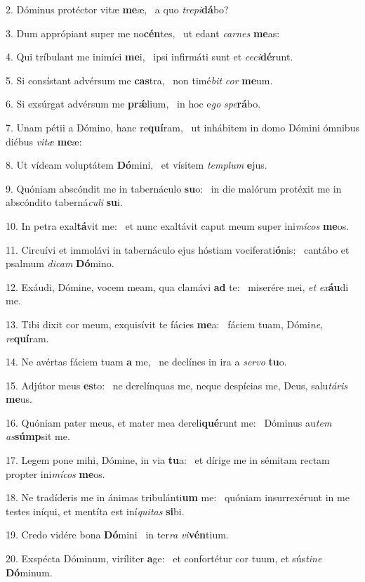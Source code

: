 2. Dóminus protéctor vitæ \textbf{me}æ, \ast\  a quo \textit{tre}\textit{pi}\textbf{dá}bo?\

3. Dum apprópiant super me no\textbf{cén}tes, \ast\  ut edant \textit{car}\textit{nes} \textbf{me}as:\

4. Qui tríbulant me inimíci \textbf{me}i, \ast\  ipsi infirmáti sunt et \textit{ce}\textit{ci}\textbf{dé}runt.\

5. Si consístant advérsum me \textbf{cas}tra, \ast\  non timé\textit{bit} \textit{cor} \textbf{me}um.\

6. Si exsúrgat advérsum me \textbf{prǽ}lium, \ast\  in hoc e\textit{go} \textit{spe}\textbf{rá}bo.\

7. Unam pétii a Dómino, hanc re\textbf{quí}ram, \ast\  ut inhábitem in domo Dómini ómnibus diébus \textit{vi}\textit{tæ} \textbf{me}æ:\

8. Ut vídeam voluptátem \textbf{Dó}mini, \ast\  et vísitem \textit{tem}\textit{plum} \textbf{e}jus.\

9. Quóniam abscóndit me in tabernáculo \textbf{su}o: \ast\  in die malórum protéxit me in abscóndito taberná\textit{cu}\textit{li} \textbf{su}i.\

10. In petra exal\textbf{tá}vit me: \ast\  et nunc exaltávit caput meum super ini\textit{mí}\textit{cos} \textbf{me}os.\

11. Circuívi et immolávi in tabernáculo ejus hóstiam vociferati\textbf{ó}nis: \ast\  cantábo et psalmum \textit{di}\textit{cam} \textbf{Dó}mino.\

12. Exáudi, Dómine, vocem meam, qua clamávi \textbf{ad} te: \ast\  miserére mei, \textit{et} \textit{ex}\textbf{áu}di me.\

13. Tibi dixit cor meum, exquisívit te fácies \textbf{me}a: \ast\  fáciem tuam, Dómi\textit{ne}, \textit{re}\textbf{quí}ram.\

14. Ne avértas fáciem tuam \textbf{a} me, \ast\  ne declínes in ira a \textit{ser}\textit{vo} \textbf{tu}o.\

15. Adjútor meus \textbf{es}to: \ast\  ne derelínquas me, neque despícias me, Deus, salu\textit{tá}\textit{ris} \textbf{me}us.\

16. Quóniam pater meus, et mater mea dereli\textbf{qué}runt me: \ast\  Dóminus au\textit{tem} \textit{as}\textbf{súmp}sit me.\

17. Legem pone mihi, Dómine, in via \textbf{tu}a: \ast\  et dírige me in sémitam rectam propter ini\textit{mí}\textit{cos} \textbf{me}os.\

18. Ne tradíderis me in ánimas tribulánti\textbf{um} me: \ast\  quóniam insurrexérunt in me testes iníqui, et mentíta est iní\textit{qui}\textit{tas} \textbf{si}bi.\

19. Credo vidére bona \textbf{Dó}mini \ast\  in ter\textit{ra} \textit{vi}\textbf{vén}tium.\

20. Exspécta Dóminum, viríliter \textbf{a}ge: \ast\  et confortétur cor tuum, et sús\textit{ti}\textit{ne} \textbf{Dó}minum.\

